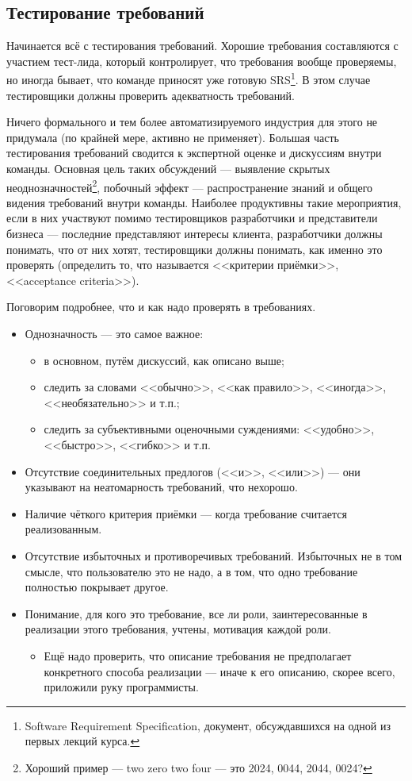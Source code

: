 \documentclass{../../text-style}
\begin{document}
\subsection{Тестирование требований}

Начинается всё с тестирования требований. Хорошие требования составляются с участием тест-лида, который контролирует, что требования вообще проверяемы, но иногда бывает, что команде приносят уже готовую SRS\footnote{Software Requirement Specification, документ, обсуждавшихся на одной из первых лекций курса.}. В этом случае тестировщики должны проверить адекватность требований.

Ничего формального и тем более автоматизируемого индустрия для этого не придумала (по крайней мере, активно не применяет). Большая часть тестирования требований сводится к экспертной оценке и дискуссиям внутри команды. Основная цель таких обсуждений --- выявление скрытых неоднозначностей\footnote{Хороший пример --- two zero two four --- это 2024, 0044, 2044, 0024?}, побочный эффект --- распространение знаний и общего видения требований внутри команды. Наиболее продуктивны такие мероприятия, если в них участвуют помимо тестировщиков разработчики и представители бизнеса --- последние представляют интересы клиента, разработчики должны понимать, что от них хотят, тестировщики должны понимать, как именно это проверять (определить то, что называется <<критерии приёмки>>, <<acceptance criteria>>). 

Поговорим подробнее, что и как надо проверять в требованиях.

\begin{itemize}
    \item Однозначность --- это самое важное:
    \begin{itemize}
        \item в основном, путём дискуссий, как описано выше;
        \item следить за словами <<обычно>>, <<как правило>>, <<иногда>>, <<необязательно>> и т.п.;
        \item следить за субъективными оценочными суждениями: <<удобно>>, <<быстро>>, <<гибко>> и т.п.
    \end{itemize}
    \item Отсутствие соединительных предлогов (<<и>>, <<или>>) --- они указывают на неатомарность требований, что нехорошо.
    \item Наличие чёткого критерия приёмки --- когда требование считается реализованным.
    \item Отсутствие избыточных и противоречивых требований. Избыточных не в том смысле, что пользователю это не надо, а в том, что одно требование полностью покрывает другое.
    \item Понимание, для кого это требование, все ли роли, заинтересованные в реализации этого требования, учтены, мотивация каждой роли.
    \begin{itemize}
        \item Ещё надо проверить, что описание требования не предполагает конкретного способа реализации --- иначе к его описанию, скорее всего, приложили руку программисты.
    \end{itemize}
\end{itemize}
\end{document}

